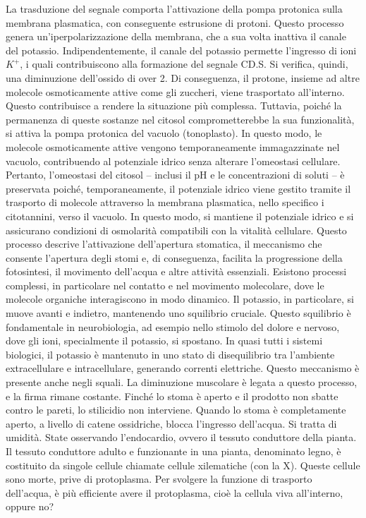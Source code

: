 \documentclass[11pt, a4paper]{article}
\begin{document}
\begin{spacing}{1}
La trasduzione del segnale comporta l'attivazione della pompa protonica sulla membrana plasmatica, con conseguente estrusione di protoni. Questo processo genera un'iperpolarizzazione della membrana, che a sua volta inattiva il canale del potassio. Indipendentemente, il canale del potassio permette l'ingresso di ioni $K^+$, i quali contribuiscono alla formazione del segnale CD.S. Si verifica, quindi, una diminuzione dell'ossido di over 2.
Di conseguenza, il protone, insieme ad altre molecole osmoticamente attive come gli zuccheri, viene trasportato all'interno. Questo contribuisce a rendere la situazione più complessa. Tuttavia, poiché la permanenza di queste sostanze nel citosol comprometterebbe la sua funzionalità, si attiva la pompa protonica del vacuolo (tonoplasto). In questo modo, le molecole osmoticamente attive vengono temporaneamente immagazzinate nel vacuolo, contribuendo al potenziale idrico senza alterare l'omeostasi cellulare.
Pertanto, l'omeostasi del citosol -- inclusi il pH e le concentrazioni di soluti -- è preservata poiché, temporaneamente, il potenziale idrico viene gestito tramite il trasporto di molecole attraverso la membrana plasmatica, nello specifico i citotannini, verso il vacuolo. In questo modo, si mantiene il potenziale idrico e si assicurano condizioni di osmolarità compatibili con la vitalità cellulare. Questo processo descrive l'attivazione dell'apertura stomatica, il meccanismo che consente l'apertura degli stomi e, di conseguenza, facilita la progressione della fotosintesi, il movimento dell'acqua e altre attività essenziali.
Esistono processi complessi, in particolare nel contatto e nel movimento molecolare, dove le molecole organiche interagiscono in modo dinamico. Il potassio, in particolare, si muove avanti e indietro, mantenendo uno squilibrio cruciale. Questo squilibrio è fondamentale in neurobiologia, ad esempio nello stimolo del dolore e nervoso, dove gli ioni, specialmente il potassio, si spostano. In quasi tutti i sistemi biologici, il potassio è mantenuto in uno stato di disequilibrio tra l'ambiente extracellulare e intracellulare, generando correnti elettriche. Questo meccanismo è presente anche negli squali. La diminuzione muscolare è legata a questo processo, e la firma rimane costante.
Finché lo stoma è aperto e il prodotto non sbatte contro le pareti, lo stilicidio non interviene. Quando lo stoma è completamente aperto, a livello di catene ossidriche, blocca l'ingresso dell'acqua. Si tratta di umidità.
State osservando l'endocardio, ovvero il tessuto conduttore della pianta. Il tessuto conduttore adulto e funzionante in una pianta, denominato legno, è costituito da singole cellule chiamate cellule xilematiche (con la X). Queste cellule sono morte, prive di protoplasma. Per svolgere la funzione di trasporto dell'acqua, è più efficiente avere il protoplasma, cioè la cellula viva all'interno, oppure no?

\end{spacing}
\end{document}
